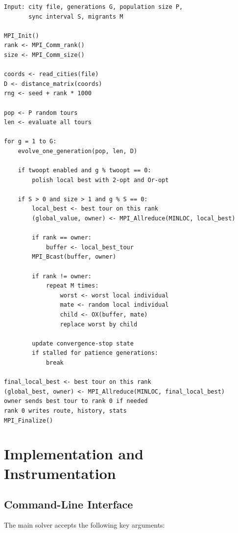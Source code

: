 \documentclass[11pt,a4paper]{article}
\begin{document}
\begin{lstlisting}[language={},caption={Island-model GA with partial global-best migration}]
Input: city file, generations G, population size P,
       sync interval S, migrants M

MPI_Init()
rank <- MPI_Comm_rank()
size <- MPI_Comm_size()

coords <- read_cities(file)
D <- distance_matrix(coords)
rng <- seed + rank * 1000

pop <- P random tours
len <- evaluate all tours

for g = 1 to G:
    evolve_one_generation(pop, len, D)

    if twoopt enabled and g % twoopt == 0:
        polish local best with 2-opt and Or-opt

    if S > 0 and size > 1 and g % S == 0:
        local_best <- best tour on this rank
        (global_value, owner) <- MPI_Allreduce(MINLOC, local_best)

        if rank == owner:
            buffer <- local_best_tour
        MPI_Bcast(buffer, owner)

        if rank != owner:
            repeat M times:
                worst <- worst local individual
                mate <- random local individual
                child <- OX(buffer, mate)
                replace worst by child

        update convergence-stop state
        if stalled for patience generations:
            break

final_local_best <- best tour on this rank
(global_best, owner) <- MPI_Allreduce(MINLOC, final_local_best)
owner sends best tour to rank 0 if needed
rank 0 writes route, history, stats
MPI_Finalize()
\end{lstlisting}

\section{Implementation and Instrumentation}

\subsection{Command-Line Interface}
The main solver accepts the following key arguments:
\end{document}
